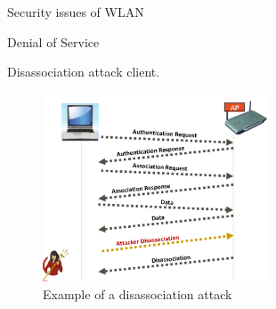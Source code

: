 \begin{section}{Security issues of WLAN}
\begin{subsection}{Denial of Service}
\begin{subsubsection}{Disassociation attack}
      client.\\
      \begin{figure}[h]
        \centering
        \includegraphics[width=0.6\textwidth]{img/wireless/disassociation attack.png}
        \caption{Example of a disassociation attack}
      \end{figure}

    \end{subsubsection}

  \end{subsection}

\end{section}


